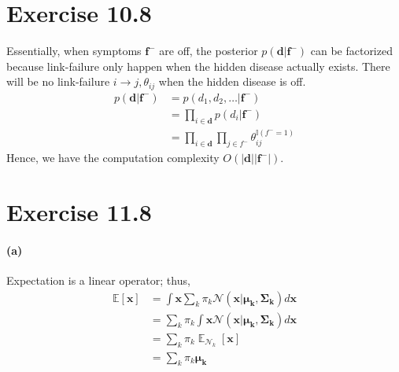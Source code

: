 \documentclass[11pt, letterpaper]{article}
\begin{document}
\section{Exercise 10.8}
Essentially, when symptoms $\mathbf{f^{-}}$ are off, the posterior $p(\mathbf{d}|\mathbf{f^-})$ can be factorized because link-failure only happen when the hidden disease actually exists. There will be no link-failure $i \rightarrow j, \theta_{ij}$ when the hidden disease is off.
\begin{align*}
    p(\mathbf{d}|\mathbf{f^-}) &= p(d_1, d_2, \dots|\mathbf{f^-}) \\
        &= \prod_{i \in \mathbf{d}} p(d_i|\mathbf{f^-}) \\
        &= \prod_{i \in \mathbf{d}} \prod_{j \in f^-} \theta_{ij}^{\mathbb{I}(f^-=1)}
\end{align*}
Hence, we have the computation complexity $O(|\mathbf{d}||\mathbf{f^-}|)$.

\section{Exercise 11.8}
\paragraph{(a)}
Expectation is a linear operator; thus,
\begin{align*}
    \mathbb{E}[\mathbf{x}] &= \int \mathbf{x} \sum_k \pi_k \mathcal{N}(\mathbf{x}|\mathbf{\mu_k}, \mathbf{\Sigma_k}) d\mathbf{x} \\
        &= \sum_k \pi_k \int \mathbf{x} \mathcal{N}(\mathbf{x}|\mathbf{\mu_k}, \mathbf{\Sigma_k}) d\mathbf{x} \\
        &= \sum_k \pi_k \mathop{\mathbb{E}}_{\mathcal{N}_k}[\mathbf{x}] \\
        &= \sum_k \pi_k \mathbf{\mu_k}
\end{align*}
\end{document}
